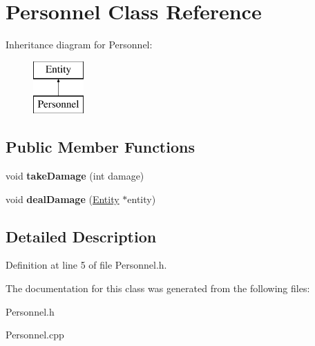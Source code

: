 \hypertarget{classPersonnel}{}\section{Personnel Class Reference}
\label{classPersonnel}
Inheritance diagram for Personnel\+:\begin{figure}[H]
\begin{center}
\leavevmode
\includegraphics[height=2.000000cm]{classPersonnel}
\end{center}
\end{figure}
\subsection*{Public Member Functions}
\begin{DoxyCompactItemize}
\item 
\mbox{\label{classPersonnel_aeb670c84c0168f872346c55f7fc8383f}} 
void {\bfseries take\+Damage} (int damage)
\item 
\mbox{\label{classPersonnel_af688c3cc32f413b1d17fe423f25aa50b}} 
void {\bfseries deal\+Damage} (\hyperlink{classEntity}{Entity} $\ast$entity)
\end{DoxyCompactItemize}


\subsection{Detailed Description}


Definition at line 5 of file Personnel.\+h.



The documentation for this class was generated from the following files\+:\begin{DoxyCompactItemize}
\item 
Personnel.\+h\item 
Personnel.\+cpp\end{DoxyCompactItemize}
